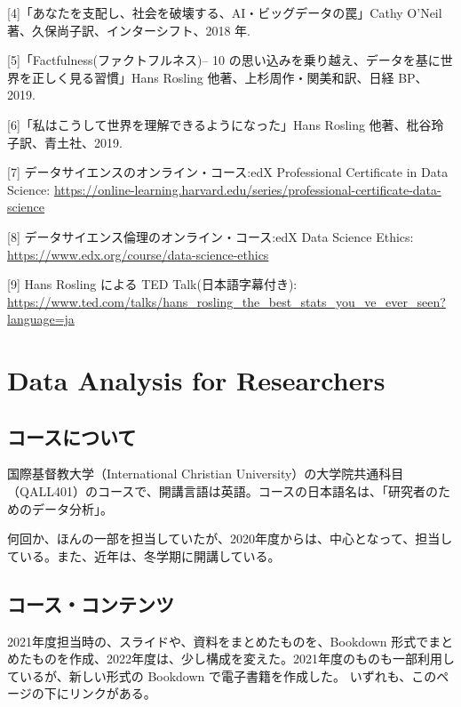\documentclass[
]{book}
\theoremstyle{definition}
\theoremstyle{definition}
\theoremstyle{definition}
\theoremstyle{definition}
\theoremstyle{remark}
\begin{document}
{[}4{]}「あなたを支配し、社会を破壊する、AI・ビッグデータの罠」Cathy O'Neil 著、久保尚子訳、インターシフト、2018 年.

{[}5{]}「Factfulness(ファクトフルネス)-- 10 の思い込みを乗り越え、データを基に世界を正しく見る習慣」Hans
Rosling 他著、上杉周作・関美和訳、日経 BP、2019.

{[}6{]}「私はこうして世界を理解できるようになった」Hans Rosling 他著、枇谷玲子訳、青土社、2019.

{[}7{]} データサイエンスのオンライン・コース:edX Professional Certificate in Data Science:
\url{https://online-learning.harvard.edu/series/professional-certificate-data-science}

{[}8{]} データサイエンス倫理のオンライン・コース:edX Data Science Ethics: \url{https://www.edx.org/course/data-science-ethics}

{[}9{]} Hans Rosling による TED Talk(日本語字幕付き): \url{https://www.ted.com/talks/hans_rosling_the_best_stats_you_ve_ever_seen?language=ja}

\hypertarget{da4r}{%
\chapter{Data Analysis for Researchers}\label{da4r}}

\hypertarget{ux30b3ux30fcux30b9ux306bux3064ux3044ux3066}{%
\section{コースについて}\label{ux30b3ux30fcux30b9ux306bux3064ux3044ux3066}}

国際基督教大学（International Christian University）の大学院共通科目（QALL401）のコースで、開講言語は英語。コースの日本語名は、「研究者のためのデータ分析」。

何回か、ほんの一部を担当していたが、2020年度からは、中心となって、担当している。また、近年は、冬学期に開講している。

\hypertarget{ux30b3ux30fcux30b9ux30b3ux30f3ux30c6ux30f3ux30c4}{%
\section{コース・コンテンツ}\label{ux30b3ux30fcux30b9ux30b3ux30f3ux30c6ux30f3ux30c4}}

2021年度担当時の、スライドや、資料をまとめたものを、Bookdown 形式でまとめたものを作成、2022年度は、少し構成を変えた。2021年度のものも一部利用しているが、新しい形式の Bookdown で電子書籍を作成した。
いずれも、このページの下にリンクがある。
\end{document}
